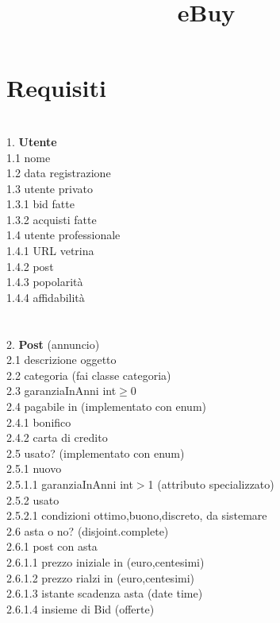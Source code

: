 \documentclass[12pt, letterpaper]{article}
\title{\textbf{eBuy}}
\date{}
\newcommand{\acc}{\\\hphantom{}\\}
\newcommand{\id}{{\hphantom{ident}}}
\begin{document}
\maketitle\section{Requisiti}
\hphantom{a}\\
1.  \textbf{Utente}\\
\id	1.1 nome\\
\id	1.2 data registrazione\\
\id 1.3 utente privato\\ 
\id \id	1.3.1 bid fatte\\
\id \id	1.3.2 acquisti fatte\\
\id 1.4 utente professionale\\ 
\id \id 1.4.1 URL vetrina\\
\id \id 1.4.2 post\\
\id \id 1.4.3 popolarità\\
\id \id 1.4.4 affidabilità\\
\acc
2.  \textbf{Post} (annuncio)\\
\id2.1 descrizione oggetto\\
\id2.2 categoria (fai classe categoria)\\
\id	2.3 garanziaInAnni int$\ge$0\\
\id	2.4 pagabile in (implementato con enum)\\
\id\id		2.4.1 bonifico\\
\id\id		2.4.2 carta di credito\\
\id	2.5 usato? (implementato con enum)\\
\id\id		2.5.1 nuovo\\
\id\id\id			2.5.1.1 garanziaInAnni int$>$1 (attributo specializzato)\\
\id\id	2.5.2 usato\\
\id\id\id		2.5.2.1 condizioni {ottimo,buono,discreto, da sistemare}\\
\id2.6 asta o no? (disjoint.complete)\\
\id\id		2.6.1 post con asta\\
\id\id\id		2.6.1.1 prezzo iniziale in (euro,centesimi)\\
\id\id\id		2.6.1.2 prezzo rialzi in (euro,centesimi)\\
\id\id\id		2.6.1.3 istante scadenza asta (date time)\\
\id\id\id		2.6.1.4 insieme di Bid (offerte)\\
\end{document}
